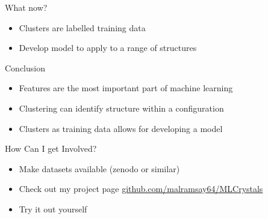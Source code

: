 \documentclass[aspectratio=169, 14pt]{beamer}
\begin{document}
\begin{frame}{What now?}

  \begin{itemize}
    \item Clusters are labelled training data
    \item Develop model to apply to a range of structures
  \end{itemize}

\end{frame}


\begin{frame}{Conclusion}

  \begin{itemize}
    \item Features are the most important part of machine learning
    \item Clustering can identify structure within a configuration
    \item Clusters as training data allows for developing a model
  \end{itemize}

\end{frame}


\begin{frame}{How Can I get Involved?}

  \begin{itemize}
    \item Make datasets available (zenodo or similar)
    \item Check out my project page \url{github.com/malramsay64/MLCrystals}
    \item Try it out yourself
  \end{itemize}

\end{frame}
\end{document}
